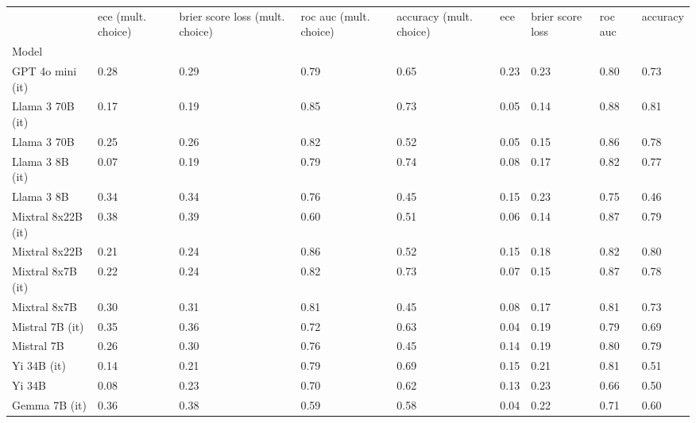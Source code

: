 \begin{tabular}{lllllllll}
\toprule
 & ece (mult. choice) & brier score loss (mult. choice) & roc auc (mult. choice) & accuracy (mult. choice) & ece & brier score loss & roc auc & accuracy \\
Model &  &  &  &  &  &  &  &  \\
\midrule
GPT 4o mini (it) & 0.28 & 0.29 & 0.79 & 0.65 & 0.23 & 0.23 & 0.80 & 0.73 \\
Llama 3 70B (it) & 0.17 & \cellcolor{cyan!17.1} 0.19 & \cellcolor{cyan!23.3} 0.85 & \cellcolor{cyan!15.4} 0.73 & \cellcolor{cyan!0.7} 0.05 & \cellcolor{cyan!25.0} 0.14 & \cellcolor{cyan!25.0} 0.88 & \cellcolor{cyan!25.0} 0.81 \\
Llama 3 70B & 0.25 & 0.26 & \cellcolor{cyan!2.3} 0.82 & 0.52 & 0.05 & \cellcolor{cyan!16.7} 0.15 & \cellcolor{cyan!13.6} 0.86 & \cellcolor{cyan!5.8} 0.78 \\
Llama 3 8B (it) & 0.07 & \cellcolor{cyan!25.0} 0.19 & 0.79 & \cellcolor{cyan!25.0} 0.74 & 0.08 & 0.17 & 0.82 & 0.77 \\
Llama 3 8B & 0.34 & 0.34 & 0.76 & \cellcolor{orange!25.0} 0.45 & 0.15 & 0.23 & 0.75 & \cellcolor{orange!25.0} 0.46 \\
Mixtral 8x22B (it) & \cellcolor{orange!23.0} 0.38 & \cellcolor{orange!8.0} 0.39 & 0.60 & 0.51 & 0.06 & \cellcolor{cyan!21.9} 0.14 & \cellcolor{cyan!24.4} 0.87 & \cellcolor{cyan!16.5} 0.79 \\
Mixtral 8x22B & 0.21 & 0.24 & \cellcolor{cyan!25.0} 0.86 & 0.52 & 0.15 & 0.18 & 0.82 & \cellcolor{cyan!20.7} 0.80 \\
Mixtral 8x7B (it) & 0.22 & 0.24 & \cellcolor{cyan!6.8} 0.82 & \cellcolor{cyan!13.7} 0.73 & 0.07 & \cellcolor{cyan!16.7} 0.15 & \cellcolor{cyan!23.2} 0.87 & \cellcolor{cyan!7.2} 0.78 \\
Mixtral 8x7B & 0.30 & 0.31 & \cellcolor{cyan!1.1} 0.81 & \cellcolor{orange!24.1} 0.45 & 0.08 & 0.17 & 0.81 & 0.73 \\
Mistral 7B (it) & \cellcolor{orange!6.6} 0.35 & 0.36 & 0.72 & 0.63 & \cellcolor{cyan!7.4} 0.04 & 0.19 & 0.79 & 0.69 \\
Mistral 7B & 0.26 & 0.30 & 0.76 & \cellcolor{orange!25.0} 0.45 & 0.14 & 0.19 & 0.80 & \cellcolor{cyan!12.9} 0.79 \\
Yi 34B (it) & 0.14 & 0.21 & 0.79 & 0.69 & 0.15 & 0.21 & 0.81 & 0.51 \\
Yi 34B & 0.08 & 0.23 & 0.70 & 0.62 & 0.13 & 0.23 & 0.66 & 0.50 \\
Gemma 7B (it) & \cellcolor{orange!10.0} 0.36 & 0.38 & 0.59 & 0.58 & \cellcolor{cyan!8.8} 0.04 & 0.22 & 0.71 & 0.60 \\

\end{tabular}
